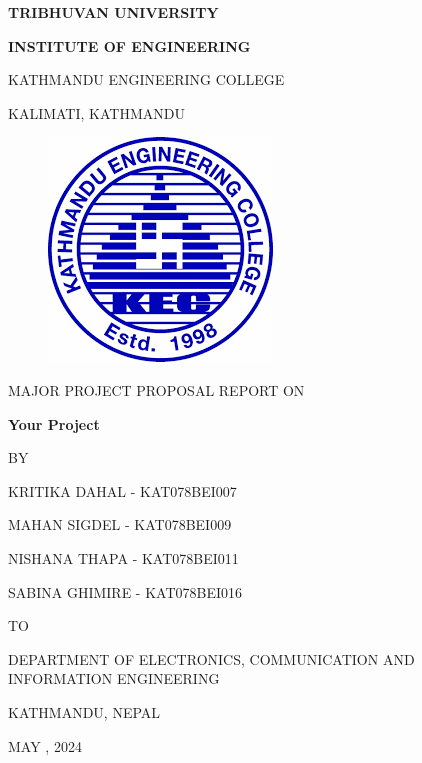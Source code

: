 \begin{titlepage}
    \thispagestyle{empty}
    \begin{center}
    
    \vspace*{\fill} %
    \vspace*{-1cm}
    {\large \textbf{TRIBHUVAN UNIVERSITY
}\par}
{\large \textbf{INSTITUTE OF ENGINEERING
}\par}
\vspace{8pt}
KATHMANDU ENGINEERING COLLEGE

KALIMATI, KATHMANDU
\vspace{24pt}

\begin{figure}[ht]
    \centering
    \includegraphics[scale=0.45]{images/kec.png}
\end{figure}
\vspace{24pt}
{MAJOR PROJECT PROPOSAL REPORT ON\par}
\vspace{14pt}
{\textbf{ Your Project}\par}

\vspace{14pt}
{BY\par}
\vspace{14pt}

{KRITIKA DAHAL - KAT078BEI007\par}
{MAHAN SIGDEL - KAT078BEI009\par}
{NISHANA THAPA - KAT078BEI011\par}
{SABINA GHIMIRE - KAT078BEI016\par}

\vspace{24pt}
{TO\par}
\vspace{14pt}
{DEPARTMENT OF ELECTRONICS, COMMUNICATION AND INFORMATION ENGINEERING\par}
{KATHMANDU, NEPAL\par}
{MAY , 2024\par}


    \end{center}
\end{titlepage}